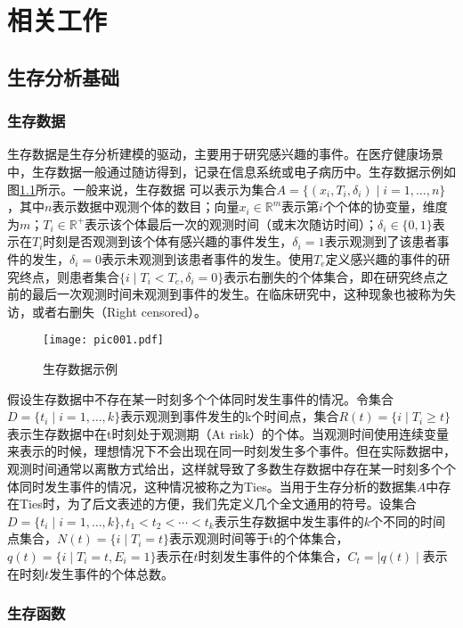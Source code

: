 \chapter{相关工作}

\section{生存分析基础}

\subsection{生存数据}

生存数据是生存分析建模的驱动，主要用于研究感兴趣的事件。在医疗健康场景中，生存数据一般通过随访得到，记录在信息系统或电子病历中。生存数据示例如图\ref{pic001}所示。一般来说，生存数据 可以表示为集合$A=\{(x_i,T_i,\delta_i ) \mid i=1,\dots,n\}$，其中$n$表示数据中观测个体的数目；向量$x_i\in \mathbb{R}^m$表示第$i$个个体的协变量，维度为$m$；$T_i\in \mathbb{R}^+$表示该个体最后一次的观测时间（或末次随访时间）；$\delta_i\in \{0,1\}$表示在$T_i$时刻是否观测到该个体有感兴趣的事件发生，$\delta_i=1$表示观测到了该患者事件的发生，$\delta_i=0$表示未观测到该患者事件的发生。使用$T_e$定义感兴趣的事件的研究终点，则患者集合$\{i \mid T_i<T_e,\delta_i=0\}$表示右删失的个体集合，即在研究终点之前的最后一次观测时间未观测到事件的发生。在临床研究中，这种现象也被称为失访，或者右删失（Right censored）。

\begin{figure}[h]
\texttt{[image: pic001.pdf]}
\caption{生存数据示例}
\label{pic001}
\end{figure}

假设生存数据中不存在某一时刻多个个体同时发生事件的情况。令集合$D=\{t_i \mid i=1,\dots,k\}$表示观测到事件发生的k个时间点，集合$R(t)=\{i \mid T_i\ge t\}$表示生存数据中在t时刻处于观测期（At risk）的个体。当观测时间使用连续变量来表示的时候，理想情况下不会出现在同一时刻发生多个事件。但在实际数据中，观测时间通常以离散方式给出，这样就导致了多数生存数据中存在某一时刻多个个体同时发生事件的情况，这种情况被称之为Ties。当用于生存分析的数据集$A$中存在Ties时，为了后文表述的方便，我们先定义几个全文通用的符号。设集合$D=\{t_i \mid i=1,\dots,k\},t_1<t_2<\cdots<t_k$表示生存数据中发生事件的$k$个不同的时间点集合，$N(t)=\{i \mid T_i=t\}$表示观测时间等于t的个体集合，$q(t)=\{i \mid T_i=t,E_i=1\}$表示在$t$时刻发生事件的个体集合，$C_t=\mid q(t) \mid$表示在时刻$t$发生事件的个体总数。

\subsection{生存函数}

